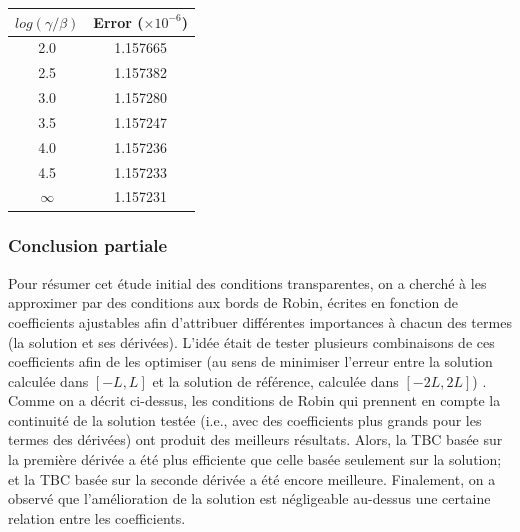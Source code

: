 \begingroup
\begin{center}
		\begin{tabular}{c|c}
			$log(\gamma/\beta)$ & Error ($\times 10^{-6}$) \\
			\hline
			2.0 & 1.157665\\
			2.5 & 1.157382\\
			3.0 & 1.157280\\
			3.5 & 1.157247\\
			4.0 & 1.157236\\
			4.5 & 1.157233\\
			$\infty$ & 1.157231	
		\end{tabular}
\end{center}
\endgroup

\subsubsection{Conclusion partiale} 

\indent Pour résumer cet étude initial des conditions transparentes, on a cherché à les approximer par des conditions aux bords de Robin, écrites en fonction de coefficients ajustables afin d'attribuer différentes importances à chacun des termes (la solution et ses dérivées). L'idée était de tester plusieurs combinaisons de ces coefficients afin de les optimiser (au sens de minimiser l'erreur entre la solution calculée dans $[-L,L]$ et la solution de référence, calculée dans $[-2L,2L]$) . Comme on a décrit ci-dessus, les conditions de Robin qui prennent en compte la continuité de la solution testée (i.e., avec des coefficients plus grands pour les termes des dérivées) ont produit des meilleurs résultats. Alors, la TBC basée sur la première dérivée a été plus efficiente que celle basée seulement sur la solution; et la TBC basée sur la seconde dérivée a été encore meilleure. Finalement, on a observé que l'amélioration de la solution est négligeable au-dessus une certaine relation entre les coefficients.

























